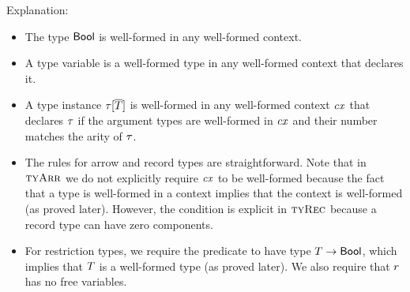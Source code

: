 Explanation:
\begin{itemize}
\item
The type $\mathsf{Bool}$ is well-formed in any well-formed context.
\item
A type variable is a well-formed type in any well-formed context that declares
it.
\item
A type instance $\tau[\overline{T}]$ is well-formed in any well-formed context $\mathit{cx}$ that
declares $\tau$ if the argument types are well-formed in $\mathit{cx}$ and their
number matches the arity of $\tau$.
\item
The rules for arrow and record types are straightforward. Note that in
$\textsc{tyArr}$ we do not explicitly require $\mathit{cx}$ to be well-formed because the fact
that a type is well-formed in a context implies that the context is
well-formed (as proved later). However, the condition is explicit in $\textsc{tyRec}$
because a record type can have zero components.
\item
For restriction types, we require the predicate to have type
$T\to\mathsf{Bool}$, which implies that $T$ is a well-formed type (as
proved later). We also require that $r$ has no free variables.
\end{itemize}


